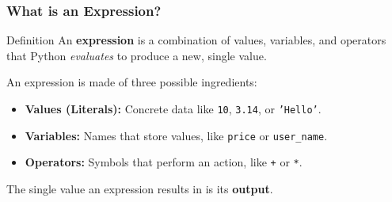 \documentclass{beamer}
\begin{document}
\begin{frame}[fragile]
    \frametitle{What is an Expression?}

    \begin{block}{Definition}
        An \textbf{expression} is a combination of values, variables, and operators that Python \textit{evaluates} to produce a new, single value.
    \end{block}

    \vspace{1em}

    An expression is made of three possible ingredients:
    \begin{itemize}
        \item \textbf{Values (Literals):} Concrete data like \texttt{10}, \texttt{3.14}, or \texttt{'Hello'}.
        \item \textbf{Variables:} Names that store values, like \texttt{price} or \texttt{user\_name}.
        \item \textbf{Operators:} Symbols that perform an action, like \texttt{+} or \texttt{*}.
    \end{itemize}

    \vfill
    \begin{center}
        \small The single value an expression results in is its \textbf{output}.
    \end{center}

\end{frame}
\end{document}
